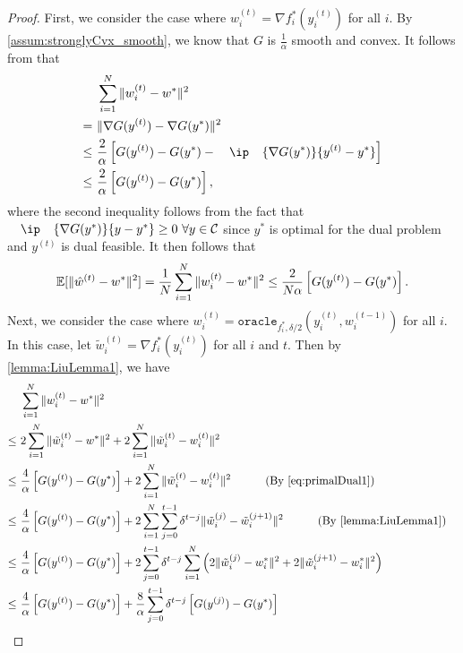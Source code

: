 \begin{proof}
    First, we consider the case where $w_i^{(t)} = \nabla f_i^*(y_i^{(t)})$ for all $i$. By \autoref{assum:stronglyCvx_smooth}, we know that $G$ is $\frac{1}{\alpha}$ smooth and convex. It follows from \citep[Theorem~2.1.5]{cvxopt_lecture} that 
    \begin{equation} \label{eq:primalDual1}
    \begin{split}
        &\sum_{i=1}^N \|w_i^{(t)} - w^*\|^2 \\
        =~& \| \nabla G( y^{(t)} ) - \nabla G(y^*) \|^2\\
        \leq~& \frac{2}{\alpha} \left[G(y^{(t)}) - G(y^*) -  \ip{\nabla G(y^*)}{y^{(t)} - y^*}\right] \\
        \leq~& \frac{2}{\alpha} \left[G(y^{(t)}) - G(y^*) \right],
    \end{split}
    \end{equation}
    where the second inequality follows from the fact that $\ip{\nabla G(y^*)}{y - y^*} \geq 0~\forall y \in \Cscr $ since $y^*$ is optimal for the dual problem and $y^{(t)}$ is dual feasible. It then follows that 
    \[\mathbb{E}[\|\hat w^{(t)} - w^*\|^2] = \frac{1}{N}\sum_{i=1}^N \|w_i^{(t)} - w^*\|^2 \leq \frac{2}{N\alpha} \left[G(y^{(t)}) - G(y^*) \right].\]
    Next, we consider the case where $w_i^{(t)} = \texttt{oracle}_{f_i^*, \delta/2}(y^{(t)}_i, w_{i}^{(t-1)})$ for all $i$. In this case, let $\tilde w_i^{(t)} = \nabla f_i^*(y_i^{(t)})$ for all $i$ and $t$. Then by \autoref{lemma:LiuLemma1}, we have 
    \begin{align*}
        & \sum_{i=1}^N \|w_i^{(t)} - w^*\|^2 
        \\\leq~& 2\sum_{i=1}^N \|\tilde w_i^{(t)} - w^*\|^2 + 2\sum_{i=1}^N \|\tilde w_i^{(t)} - w_i^{(t)}\|^2
        \\\leq~& \frac{4}{\alpha}\left[G(y^{(t)}) - G(y^*) \right] + 2\sum_{i=1}^N \|\tilde w_i^{(t)} - w_i^{(t)}\|^2 \qquad \text{(By \autoref{eq:primalDual1})}
        \\\leq~& \frac{4}{\alpha}\left[G(y^{(t)}) - G(y^*) \right] + 2 \sum_{i=1}^N \sum_{j=0}^{t-1}\delta^{t-j}\|\tilde w_i^{(j)} - \tilde w_i^{(j+1)}\|^2 \qquad \text{(By \autoref{lemma:LiuLemma1})}
        \\\leq~& \frac{4}{\alpha}\left[G(y^{(t)}) - G(y^*) \right] + 2  \sum_{j=0}^{t-1}\delta^{t-j} \sum_{i=1}^N \left( 2\|\tilde w_i^{(j)} -  w_i^{*}\|^2 + 2 \|\tilde w_i^{(j+1)} -  w_i^{*}\|^2 \right)
        \\\leq~& \frac{4}{\alpha}\left[G(y^{(t)}) - G(y^*) \right] + \frac{8}{\alpha} \sum_{j=0}^{t-1} \delta^{t-j}\left[G(y^{(j)}) - G(y^*) \right] 

\end{align*}
\end{proof}
